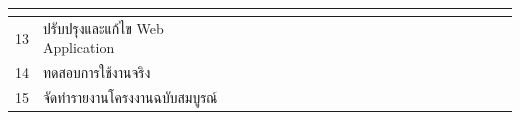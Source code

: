 \documentclass[12pt,oneside,openright,a4paper]{cpe-thai-project}
\begin{document}
\begin{table}[!ht]
{\begin{tabular}{|llllllllllllllllllllll|}
      \multicolumn{1}{l|}{\cellcolor[HTML]{FFCE93}} &
      \multicolumn{1}{l|}{\cellcolor[HTML]{FFCE93}} &
      \multicolumn{1}{l|}{\cellcolor[HTML]{FFCE93}} &
      \multicolumn{1}{l|}{\cellcolor[HTML]{FFCE93}} &
      \multicolumn{1}{l|}{\cellcolor[HTML]{FFCE93}} &
      \multicolumn{1}{l|}{\cellcolor[HTML]{FFCE93}} &
      \multicolumn{1}{l|}{\cellcolor[HTML]{FFCE93}} &
      \multicolumn{1}{l|}{\cellcolor[HTML]{FFCE93}} &
      \multicolumn{1}{l|}{\cellcolor[HTML]{FFCE93}} &
      \multicolumn{1}{l|}{} &
      \multicolumn{1}{l|}{} &
      \multicolumn{1}{l|}{} &
      \multicolumn{1}{l|}{} &
      \multicolumn{1}{l|}{} &
      \multicolumn{1}{l|}{} &
      \multicolumn{1}{l|}{} &
       \\ \hline
    \multicolumn{1}{|l|}{13} &
      \multicolumn{1}{l|}{ปรับปรุงและแก้ไข   Web Application} &
      \multicolumn{1}{l|}{\cellcolor[HTML]{FFCE93}} &
      \multicolumn{1}{l|}{\cellcolor[HTML]{FFCE93}} &
      \multicolumn{1}{l|}{\cellcolor[HTML]{FFCE93}} &
      \multicolumn{1}{l|}{\cellcolor[HTML]{FFCE93}} &
      \multicolumn{1}{l|}{\cellcolor[HTML]{FFCE93}} &
      \multicolumn{1}{l|}{\cellcolor[HTML]{FFCE93}} &
      \multicolumn{1}{l|}{\cellcolor[HTML]{FFCE93}} &
      \multicolumn{1}{l|}{\cellcolor[HTML]{FFCE93}} &
      \multicolumn{1}{l|}{\cellcolor[HTML]{FFCE93}} &
      \multicolumn{1}{l|}{\cellcolor[HTML]{FFCE93}} &
      \multicolumn{1}{l|}{\cellcolor[HTML]{FFCE93}} &
      \multicolumn{1}{l|}{\cellcolor[HTML]{FFCE93}} &
      \multicolumn{1}{l|}{} &
      \multicolumn{1}{l|}{} &
      \multicolumn{1}{l|}{} &
      \multicolumn{1}{l|}{} &
      \multicolumn{1}{l|}{} &
      \multicolumn{1}{l|}{} &
      \multicolumn{1}{l|}{} &
       \\ \hline
    \multicolumn{1}{|l|}{14} &
      \multicolumn{1}{l|}{ทดสอบการใช้งานจริง} &
      \multicolumn{1}{l|}{} &
      \multicolumn{1}{l|}{} &
      \multicolumn{1}{l|}{} &
      \multicolumn{1}{l|}{} &
      \multicolumn{1}{l|}{} &
      \multicolumn{1}{l|}{} &
      \multicolumn{1}{l|}{} &
      \multicolumn{1}{l|}{} &
      \multicolumn{1}{l|}{} &
      \multicolumn{1}{l|}{} &
      \multicolumn{1}{l|}{} &
      \multicolumn{1}{l|}{} &
      \multicolumn{1}{l|}{\cellcolor[HTML]{FFCE93}} &
      \multicolumn{1}{l|}{\cellcolor[HTML]{FFCE93}} &
      \multicolumn{1}{l|}{} &
      \multicolumn{1}{l|}{} &
      \multicolumn{1}{l|}{} &
      \multicolumn{1}{l|}{} &
      \multicolumn{1}{l|}{} &
       \\ \hline
    \multicolumn{1}{|l|}{15} &
      \multicolumn{1}{l|}{จัดทำรายงานโครงงานฉบับสมบูรณ์} &

\end{tabular}}
\end{table}
\end{document}
